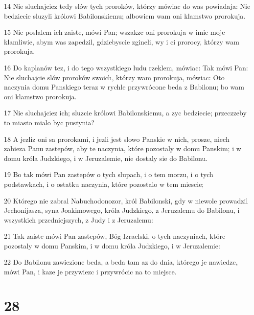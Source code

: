 \par 14 Nie sluchajciez tedy slów tych proroków, którzy mówiac do was powiadaja: Nie bedziecie sluzyli królowi Babilonskiemu; albowiem wam oni klamstwo prorokuja.
\par 15 Nie poslalem ich zaiste, mówi Pan; wszakze oni prorokuja w imie moje klamliwie, abym was zapedzil, gdziebyscie zgineli, wy i ci prorocy, którzy wam prorokuja.
\par 16 Do kaplanów tez, i do tego wszystkiego ludu rzeklem, mówiac: Tak mówi Pan: Nie sluchajcie slów proroków swoich, którzy wam prorokuja, mówiac: Oto naczynia domu Panskiego teraz w rychle przywrócone beda z Babilonu; bo wam oni klamstwo prorokuja.
\par 17 Nie sluchajciez ich; sluzcie królowi Babilonskiemu, a zyc bedziecie; przeczzeby to miasto mialo byc pustynia?
\par 18 A jezliz oni sa prorokami, i jezli jest slowo Panskie w nich, prosze, niech zabieza Panu zastepów, aby te naczynia, które pozostaly w domu Panskim; i w domu króla Judzkiego, i w Jeruzalemie, nie dostaly sie do Babilonu.
\par 19 Bo tak mówi Pan zastepów o tych slupach, i o tem morzu, i o tych podstawkach, i o ostatku naczynia, które pozostalo w tem miescie;
\par 20 Którego nie zabral Nabuchodonozor, król Babilonski, gdy w niewole prowadzil Jechonijasza, syna Joakimowego, króla Judzkiego, z Jeruzalemu do Babilonu, i wszystkich przedniejszych, z Judy i z Jeruzalemu:
\par 21 Tak zaiste mówi Pan zastepów, Bóg Izraelski, o tych naczyniach, które pozostaly w domu Panskim, i w domu króla Judzkiego, i w Jeruzalemie:
\par 22 Do Babilonu zawiezione beda, a beda tam az do dnia, którego je nawiedze, mówi Pan, i kaze je przywiezc i przywrócic na to miejsce.

\chapter{28}

